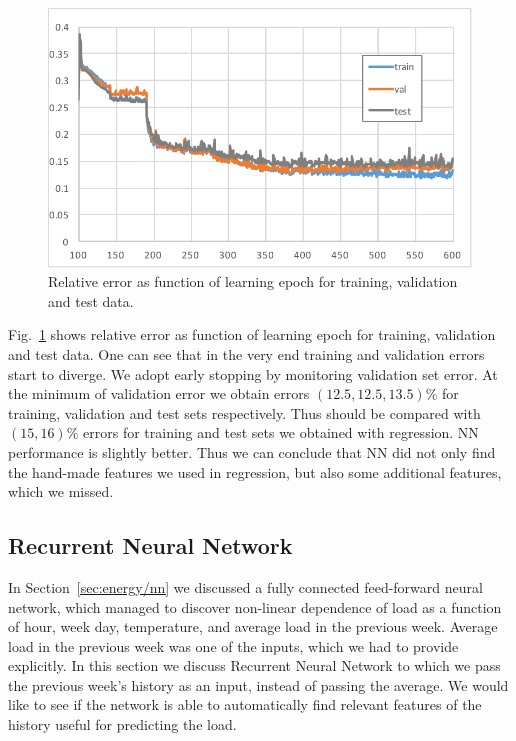 \documentclass{article} %
\begin{document}
\begin{figure}[h]
\begin{center}
\includegraphics[width=0.7\linewidth]{energy_NN_learning.pdf}	
\end{center}
\caption{Relative error as function of learning epoch for training, 
validation and test data.}
\label{fig:energy/nn/learn}
\end{figure}
Fig.~\ref{fig:energy/nn/learn} shows relative error as function of 
learning epoch for training, validation and test data.
One can see that in the very end training and validation errors start to diverge.
We adopt early stopping by monitoring validation set error.
At the minimum of validation error we obtain errors $(12.5,12.5,13.5)\%$
for training, validation and test sets respectively.
Thus should be compared with $(15,16)\%$ errors for training and test sets
we obtained with regression. NN performance is slightly better.
Thus we can conclude that NN did not only find the hand-made features we used
in regression, but also some additional features, which we missed.


\subsection{Recurrent Neural Network}
\label{sec:energy/rnn}

In Section~\ref{sec:energy/nn} we discussed a fully connected feed-forward
neural network, which managed to discover non-linear dependence
of load as a function of hour, week day, temperature, and average load in 
the previous week. Average load in the previous week was one of the inputs,
which we had to provide explicitly. In this section we discuss
Recurrent Neural Network to which we pass the previous week's history
as an input, instead of passing the average. 
We would like to see if the network is able to automatically find relevant 
features of the history useful for predicting the load.
\end{document}
